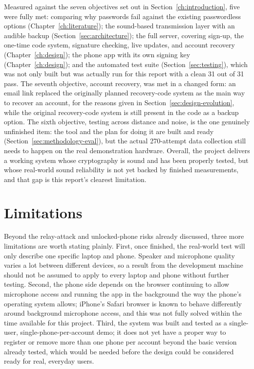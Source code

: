 Measured against the seven objectives set out in
Section~\ref{ch:introduction}, five were fully met: comparing why
passwords fail against the existing passwordless options
(Chapter~\ref{ch:literature}); the sound-based transmission layer with an
audible backup (Section~\ref{sec:architecture}); the full server, covering
sign-up, the one-time code system, signature checking, live updates, and
account recovery (Chapter~\ref{ch:design}); the phone app with its own
signing key (Chapter~\ref{ch:design}); and the automated test suite
(Section~\ref{sec:testing}), which was not only built but was actually run
for this report with a clean 31 out of 31 pass. The seventh objective,
account recovery, was met in a changed form: an email link replaced the
originally planned recovery-code system as the main way to recover an
account, for the reasons given in Section~\ref{sec:design-evolution},
while the original recovery-code system is still present in the code as a
backup option. The sixth objective, testing across distance and noise, is
the one genuinely unfinished item: the tool and the plan for doing it are
built and ready (Section~\ref{sec:methodology-eval}), but the actual
270-attempt data collection still needs to happen on the real
demonstration hardware. Overall, the project delivers a working system
whose cryptography is sound and has been properly tested, but whose
real-world sound reliability is not yet backed by finished measurements,
and that gap is this report's clearest limitation.

\section{Limitations}

Beyond the relay-attack and unlocked-phone risks already discussed, three
more limitations are worth stating plainly. First, once finished, the
real-world test will only describe one specific laptop and phone.
Speaker and microphone quality varies a lot between different devices, so
a result from the development machine should not be assumed to apply to
every laptop and phone without further testing. Second, the phone side
depends on the browser continuing to allow microphone access and running
the app in the background the way the phone's operating system allows;
iPhone's Safari browser is known to behave differently around background
microphone access, and this was not fully solved within the time
available for this project. Third, the system was built and tested as a
single-user, single-phone-per-account demo; it does not yet have a proper
way to register or remove more than one phone per account beyond the
basic version already tested, which would be needed before the design
could be considered ready for real, everyday users.

